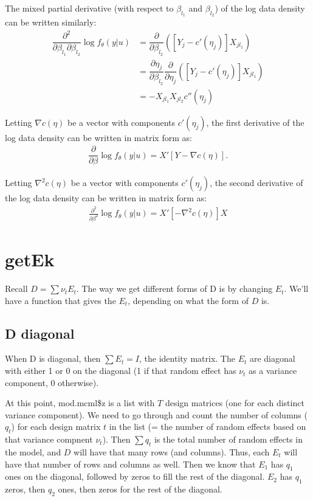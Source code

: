\documentclass{article}
\begin{document}
The mixed partial derivative (with respect to $\beta_{l_1}$ and $\beta_{l_2}$) of the log data density can be written similarly:
\begin{align}
\dfrac{\partial^2}{\partial \beta_{l_1} \partial \beta_{l_2}}  \log f_\theta(y|u) &=\dfrac{\partial}{\partial \beta_{l_2}} \left( \left[ Y_j-c'(\eta_j) \right]  X_{j{l_1}} \right) \\
&= \dfrac{\partial \eta_j}{\partial \beta_{l_2}} \dfrac{\partial}{\partial \eta_j} \left( \left[ Y_j-c'(\eta_j) \right]  X_{j{l_1}} \right) \\
&= -X_{j{l_1}} X_{j{l_2}} c''(\eta_j) 
 \end{align}


Letting $\nabla c(\eta)$ be a vector with components $c'(\eta_j)$, the first derivative of the log data density can be written in matrix form as:
\begin{align}
\dfrac{\partial}{\partial \beta}  \log f_\theta(y|u) = X' \left[ Y- \nabla c(\eta)  \right].
\end{align}

Letting $\nabla^2 c(\eta)$ be a vector with components $c'(\eta_j)$, the second derivative of the log data density can be written in matrix form as:
\begin{align}
   \frac{\partial^2}{\partial \beta^2} \log f_\theta(y|u) =   X' [ - \nabla^2 c(\eta) ] X
\end{align}


\section{getEk}
Recall $D=\sum \nu_t E_t$. The way we  get different forms of D is by changing $E_t$. We'll have a function that gives the $E_t$, depending on what the form of $D$ is.

\subsection{D diagonal}
When D is diagonal, then $\sum E_t = I$, the identity matrix. The $E_t$ are diagonal with either 1 or 0 on the diagonal (1 if that random effect has $\nu_t$ as a variance component, 0 otherwise).

At this point,  mod.mcml\$z is a list with $T$ design matrices (one for each distinct variance component).  We need to go through and count the  number of columns ($q_t$) for each design matrix $t$ in the list (= the number of random effects based on that variance compnent $\nu_t$).
 Then $\sum q_t$ is the total number of random effects in the model, and $D$ will have that many rows (and columns). Thus, each $E_t$ will have that number of rows and columns as well.  Then we know that $E_1$ has $q_1$ ones on the diagonal, followed by zeros to fill the rest of the diagonal.  $E_2$ has $q_1$ zeros, then $q_2$ ones, then zeros for the rest of the diagonal.
\end{document}
